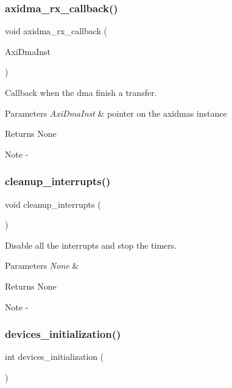 \subsubsection{axidma\_rx\_callback()}
{\footnotesize\ttfamily void axidma\+\_\+rx\+\_\+callback (\begin{DoxyParamCaption}\item[{X\+Axi\+Dma $\ast$}]{Axi\+Dma\+Inst }\end{DoxyParamCaption})}



Callback when the dma finish a transfer. 


\begin{DoxyParams}{Parameters}
{\em Axi\+Dma\+Inst} & pointer on the axidma\textquotesingle{}s instance\\
\hline
\end{DoxyParams}
\begin{DoxyReturn}{Returns}
None
\end{DoxyReturn}
\begin{DoxyNote}{Note}
-\/ 
\end{DoxyNote}
\mbox{\label{interrupt_8c_aa3db50992b6d2cd29e63b0c2d0f1596c}} 
\subsubsection{cleanup\_interrupts()}
{\footnotesize\ttfamily void cleanup\+\_\+interrupts (\begin{DoxyParamCaption}{ }\end{DoxyParamCaption})}



Disable all the interrupts and stop the timers. 


\begin{DoxyParams}{Parameters}
{\em None} & \\
\hline
\end{DoxyParams}
\begin{DoxyReturn}{Returns}
None
\end{DoxyReturn}
\begin{DoxyNote}{Note}
-\/ 
\end{DoxyNote}
\mbox{\label{interrupt_8c_a94e31fd7a13e5ce5cd73b37003db422b}} 
\subsubsection{devices\_initialization()}
{\footnotesize\ttfamily int devices\+\_\+initialization (\begin{DoxyParamCaption}{ }\end{DoxyParamCaption})}




